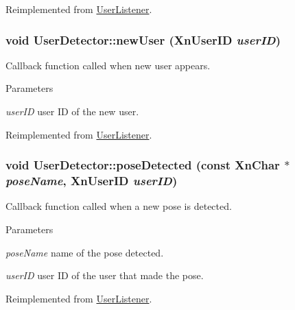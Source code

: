 Reimplemented from \hyperlink{classUserListener_a399b56657670357e6545536732c38da2}{UserListener}.

\hypertarget{classUserDetector_a42845024a854fd79a714c00cfd5fd59b}{
\subsubsection[{newUser}]{\setlength{\rightskip}{0pt plus 5cm}void UserDetector::newUser (XnUserID {\em userID})}}
\label{classUserDetector_a42845024a854fd79a714c00cfd5fd59b}
Callback function called when new user appears. 
\begin{DoxyParams}{Parameters}
\item[{\em userID}]user ID of the new user. \end{DoxyParams}


Reimplemented from \hyperlink{classUserListener_a4e7335d446ea94445305fb88b5612091}{UserListener}.

\hypertarget{classUserDetector_aa1aca77e875b9ab9b2b0b29d55672885}{
\subsubsection[{poseDetected}]{\setlength{\rightskip}{0pt plus 5cm}void UserDetector::poseDetected (const XnChar $\ast$ {\em poseName}, \/  XnUserID {\em userID})}}
\label{classUserDetector_aa1aca77e875b9ab9b2b0b29d55672885}
Callback function called when a new pose is detected. 
\begin{DoxyParams}{Parameters}
\item[{\em poseName}]name of the pose detected. \item[{\em userID}]user ID of the user that made the pose. \end{DoxyParams}


Reimplemented from \hyperlink{classUserListener_a52680abee2bb2da94e748b394a435edc}{UserListener}.


